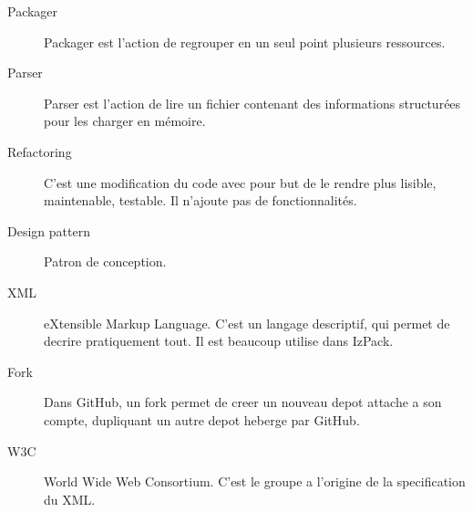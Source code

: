 \begin{description}
	\item[Packager] Packager est l'action de regrouper en un seul point plusieurs ressources.
	\item[Parser] Parser est l'action de lire un fichier contenant des informations structurées pour les charger en mémoire.
	\item[Refactoring] C'est une modification du code avec pour but de le rendre plus lisible, maintenable, testable. Il n'ajoute pas de fonctionnalités.
	\item[Design pattern] Patron de conception.
	\item[XML] eXtensible Markup Language. C'est un langage descriptif, qui permet de decrire pratiquement tout. Il est beaucoup utilise dans IzPack.
	\item[Fork] Dans GitHub, un fork permet de creer un nouveau depot attache a son compte, dupliquant un autre depot heberge par GitHub.
	\item[W3C] World Wide Web Consortium. C'est le groupe a l'origine de la specification du XML.
\end{description}
